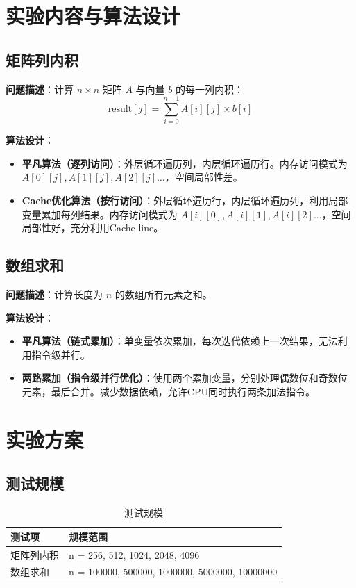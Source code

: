 \documentclass[11pt,a4paper]{article}
\begin{document}
\section{实验内容与算法设计}

\subsection{矩阵列内积}

\textbf{问题描述}：计算 \(n \times n\) 矩阵 \(A\) 与向量 \(b\) 的每一列内积：
\[
\text{result}[j] = \sum_{i=0}^{n-1} A[i][j] \times b[i]
\]

\textbf{算法设计}：

\begin{itemize}
    \item \textbf{平凡算法（逐列访问）}：外层循环遍历列，内层循环遍历行。内存访问模式为 \(A[0][j], A[1][j], A[2][j]\ldots\)，空间局部性差。
    \item \textbf{Cache优化算法（按行访问）}：外层循环遍历行，内层循环遍历列，利用局部变量累加每列结果。内存访问模式为 \(A[i][0], A[i][1], A[i][2]\ldots\)，空间局部性好，充分利用Cache line。
\end{itemize}

\subsection{数组求和}

\textbf{问题描述}：计算长度为 \(n\) 的数组所有元素之和。

\textbf{算法设计}：

\begin{itemize}
    \item \textbf{平凡算法（链式累加）}：单变量依次累加，每次迭代依赖上一次结果，无法利用指令级并行。
    \item \textbf{两路累加（指令级并行优化）}：使用两个累加变量，分别处理偶数位和奇数位元素，最后合并。减少数据依赖，允许CPU同时执行两条加法指令。
\end{itemize}

\section{实验方案}

\subsection{测试规模}

\begin{table}[h]
\centering
\caption{测试规模}
\begin{tabular}{|l|l|}
\hline
\textbf{测试项} & \textbf{规模范围} \\
\hline
矩阵列内积 & n = 256, 512, 1024, 2048, 4096 \\
\hline
数组求和 & n = 100000, 500000, 1000000, 5000000, 10000000 \\
\hline
\end{tabular}
\end{table}
\end{document}

